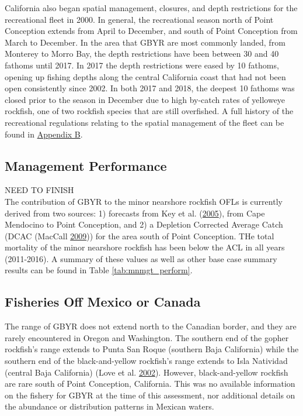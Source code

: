 \documentclass[12pt,]{article}
\begin{document}
California also began spatial management, closures, and depth
restrictions for the recreational fleet in 2000. In general, the
recreational season north of Point Conception extends from April to
December, and south of Point Conception from March to December. In the
area that GBYR are most commonly landed, from Monterey to Morro Bay, the
depth restrictions have been between 30 and 40 fathoms until 2017. In
2017 the depth restrictions were eased by 10 fathoms, opening up fishing
depths along the central California coast that had not been open
consistently since 2002. In both 2017 and 2018, the deepest 10 fathoms
was closed prior to the season in December due to high by-catch rates of
yelloweye rockfish, one of two rockfish species that are still
overfished. A full history of the recreational regulations relating to
the spatial management of the fleet can be found in
\protect\hyperlink{appendix-b.-californias-recreational-fishery-regulations}{Appendix
B}.

\subsection{Management Performance}\label{management-performance-1}

NEED TO FINISH\\
The contribution of GBYR to the minor nearshore rockfish OFLs is
currently derived from two sources: 1) forecasts from Key et al.
(\protect\hyperlink{ref-Key2005}{2005}), from Cape Mendocino to Point
Conception, and 2) a Depletion Corrected Average Catch (DCAC (MacCall
\protect\hyperlink{ref-MacCall2009}{2009})) for the area south of Point
Conception. THe total mortality of the minor nearshore rockfish has been
below the ACL in all years (2011-2016). A summary of these values as
well as other base case summary results can be found in Table
\ref{tab:mnmgt_perform}.

\subsection{Fisheries Off Mexico or
Canada}\label{fisheries-off-mexico-or-canada}

The range of GBYR does not extend north to the Canadian border, and they
are rarely encountered in Oregon and Washington. The southern end of the
gopher rockfish's range extends to Punta San Roque (southern Baja
California) while the southern end of the black-and-yellow rockfish's
range extends to Isla Natividad (central Baja California) (Love et al.
\protect\hyperlink{ref-Love2002}{2002}). However, black-and-yellow
rockfish are rare south of Point Conception, California. This was no
available information on the fishery for GBYR at the time of this
assessment, nor additional details on the abundance or distribution
patterns in Mexican waters.
\end{document}
